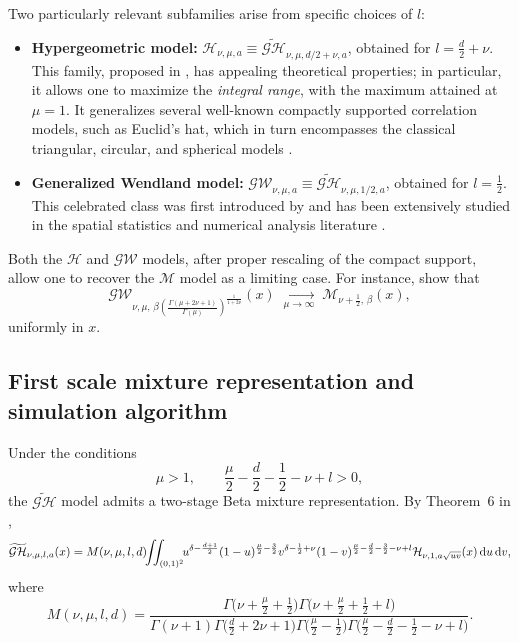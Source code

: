 \documentclass[
  12pt]{article}
\begin{document}
Two particularly relevant subfamilies arise from specific choices of $l$:
\begin{itemize}
\item \textbf{Hypergeometric model:}
$\mathcal{H}_{\nu,\mu,a} \equiv \widetilde{\mathcal{GH}}_{\nu,\mu,d/2+\nu,a}$, obtained for $l=\tfrac{d}{2}+\nu$.
This family, proposed in \cite{hyp2025}, has appealing theoretical properties; in particular, it allows one to maximize the \emph{integral range}, with the maximum attained at $\mu=1$.
It generalizes several well-known compactly supported correlation models, such as Euclid's hat, which in turn encompasses the classical triangular, circular, and spherical models \citep{Matheron1965, Gneiting1999}.

\item \textbf{Generalized Wendland model:}
$\mathcal{GW}_{\nu,\mu,a} \equiv \widetilde{\mathcal{GH}}_{\nu,\mu,1/2,a}$, obtained for $l=\tfrac{1}{2}$.
This celebrated class was first introduced by \cite{gnei02} and has been extensively studied in the spatial statistics and numerical analysis literature
\citep{Wen,Schaback:2011,Hubb14,BFFP,bevele}.
\end{itemize}

Both the $\mathcal{H}$ and $\mathcal{GW}$ models, after proper rescaling of the compact support,
allow one to recover the $\mathcal{M}$ model as a limiting case. For instance, \cite{bevilacqua2022unifying} show that
\begin{equation}\label{gwmm}
\mathcal{GW}_{\nu,\mu,\,
\beta\!\left(\frac{\Gamma(\mu+2\nu+1)}{\Gamma(\mu)}\right)^{\!\frac{1}{1+2\nu}}}(x)
\;\xrightarrow[\mu \to \infty]{}\;
\mathcal{M}_{\nu+\frac{1}{2},\,\beta}(x),
\end{equation}
uniformly in $x$.

\subsection{First scale mixture representation and simulation algorithm}

Under the conditions
\begin{equation}
\label{authorizedregion}
\mu>1, \qquad \frac{\mu}{2}-\frac{d}{2}-\frac{1}{2}-\nu+l>0,
\end{equation}
the $\widetilde{\mathcal{GH}}$ model admits a two-stage Beta mixture representation. By Theorem~6 in \cite{hyp2025},
\begin{equation}\label{eq:GH-mixture}
\widetilde{\mathcal{GH}}_{\nu,\mu,l,a}(x)
=
M(\nu,\mu,l,d)
\!\!\iint_{(0,1)^2}\!\!
u^{\delta-\frac{d+1}{2}}(1-u)^{\frac{\mu}{2}-\frac{3}{2}}
v^{\delta-\frac12+\nu}(1-v)^{\frac{\mu}{2}-\frac{d}{2}-\frac{3}{2}-\nu+l}
\mathcal{H}_{\nu,1,a\sqrt{uv}}(x)\,{\rm d}u\,{\rm d}v,
\end{equation}
where
\begin{equation}\label{eq:GH-constant}
M(\nu,\mu,l,d)
=
\frac{
\Gamma\!\bigl(\nu+\tfrac{\mu}{2}+\tfrac12\bigr)
\Gamma\!\bigl(\nu+\tfrac{\mu}{2}+\tfrac12+l\bigr)
}{
\Gamma(\nu+1)
\Gamma\!\bigl(\tfrac d2+2\nu+1\bigr)
\Gamma\!\bigl(\tfrac{\mu}{2}-\tfrac12\bigr)
\Gamma\!\bigl(\tfrac{\mu}{2}-\tfrac d2-\tfrac12-\nu+l\bigr)
}.
\end{equation}
\end{document}
